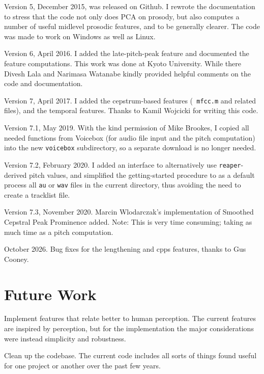 \documentclass[11pt]{article}
\begin{document}
Version 5, December 2015, was released on Github.  I rewrote the
documentation to stress that the code not only does PCA on prosody,
but also computes a number of useful midlevel prosodic features, and
to be generally clearer.  The code was made to work on Windows as well
as Linux.

Version 6, April 2016.  I added the late-pitch-peak feature and
documented the feature computations.  This work was done at Kyoto
University.  While there Divesh Lala and Narimasa Watanabe kindly
provided helpful comments on the code and documentation.

Version 7, April 2017.  I added the cepstrum-based features ({\tt
  mfcc.m} and related files), and the temporal features.  Thanks to
Kamil Wojcicki for writing this code.

Version 7.1, May 2019.  With the kind permission of Mike Brookes, I
copied all needed functions from Voicebox (for audio file input and
the pitch computation) into the new {\tt voicebox} subdirectory, so a
separate download is no longer needed.

Version 7.2, February 2020. I added an interface to alternatively use
{\tt reaper}-derived pitch values, and simplified the getting-started
procedure to as a default process all {\tt au} or {\tt wav} files in
the current directory, thus avoiding the need to create a tracklist
file.

Version 7.3, November 2020.  Marcin Wlodarczak's implementation of
Smoothed Cepstral Peak Prominence added.  Note: This is very time
consuming; taking as much time as a pitch computation. 

October 2026.  Bug fixes for the lengthening and cpps features, thanks to Gus Cooney. 

\section{Future Work}               \label{sec:future}

Implement features that relate better to human perception.  The
current features are inspired by perception, but for the
implementation the major considerations were instead simplicity and
robustness.

Clean up the codebase.  The current code includes all sorts of things
found useful for one project or another over the past few years.
\end{document}
